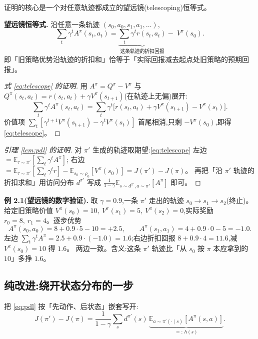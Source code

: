 \documentclass[11pt]{article}
\newcommand{\E}{\mathbb{E}}
\newcommand{\Ap}{A^{\pi}}
\newcommand{\Vp}{V^{\pi}}
\newcommand{\Qp}{Q^{\pi}}
\newcommand{\dpip}{d^{\pi'}}
\theoremstyle{plain}
\theoremstyle{definition}
\theoremstyle{remark}
\begin{document}
证明的核心是一个对任意轨迹都成立的望远镜(telescoping)恒等式。

\begin{keybox}
\textbf{望远镜恒等式.} 沿任意一条轨迹 $(s_0,a_0,s_1,a_1,\dots)$,
\begin{equation}\label{eq:telescope}
\sum_t \gamma^t \Ap(s_t,a_t)=\underbrace{\sum_t\gamma^t r(s_t,a_t)}_{\text{这条轨迹的折扣回报}}-\;\Vp(s_0).
\end{equation}
即「旧策略优势沿轨迹的折扣和」恰等于「实际回报减去起点处旧策略的预期回报」。
\end{keybox}

\begin{proof}[式 \eqref{eq:telescope} 的证明]
用 $\Ap=\Qp-\Vp$ 与 $\Qp(s_t,a_t)=r(s_t,a_t)+\gamma\Vp(s_{t+1})$(在轨迹上无偏)展开:
\[
\sum_t\gamma^t\Ap(s_t,a_t)=\sum_t\gamma^t\big[r(s_t,a_t)+\gamma\Vp(s_{t+1})-\Vp(s_t)\big].
\]
价值项 $\sum_t[\gamma^{t+1}\Vp(s_{t+1})-\gamma^t\Vp(s_t)]$ 首尾相消,只剩 $-\Vp(s_0)$,即得 \eqref{eq:telescope}。
\end{proof}

\begin{proof}[引理 \ref{lem:pdl} 的证明]
对 $\pi'$ 生成的轨迹取期望:\eqref{eq:telescope} 左边 $=\E_{\tau\sim\pi'}[\sum_t\gamma^t\Ap]$;
右边 $=\E_{\tau\sim\pi'}[\sum_t\gamma^t r]-\E_{s_0\sim\rho_0}[\Vp(s_0)]=J(\pi')-J(\pi)$。
再把「沿 $\pi'$ 轨迹的折扣求和」用访问分布 $\dpip$ 写成 $\frac{1}{1-\gamma}\E_{s\sim\dpip,a\sim\pi'}[\Ap]$ 即可。
\end{proof}

\begin{exbox}
\textbf{例 2.1(望远镜的数字验证).} 取 $\gamma=0.9$,一条 $\pi'$ 走出的轨迹 $s_0\to s_1\to s_2$(终止)。
给定旧策略价值 $\Vp(s_0)=10,\ \Vp(s_1)=5,\ \Vp(s_2)=0$,实际奖励 $r_0=8,\ r_1=4$。逐步优势
\[
\Ap(s_0,a_0)=8+0.9\cdot5-10=+2.5,\qquad \Ap(s_1,a_1)=4+0.9\cdot0-5=-1.0.
\]
左边 $\sum_t\gamma^t\Ap=2.5+0.9\cdot(-1.0)=1.6$;右边折扣回报 $8+0.9\cdot4=11.6$,减 $\Vp(s_0)=10$ 得 $1.6$。
两边一致。含义:这条 $\pi'$ 轨迹比「从 $s_0$ 按 $\pi$ 本应拿到的 $10$」多挣 $1.6$。
\end{exbox}

\subsection{纯改进:绕开状态分布的一步}

把 \eqref{eq:pdl} 按「先动作、后状态」嵌套写开:
\begin{equation}\label{eq:pdl-nest}
J(\pi')-J(\pi)=\frac{1}{1-\gamma}\sum_s \dpip(s)\,\underbrace{\E_{a\sim\pi'(\cdot\mid s)}[\Ap(s,a)]}_{=:\,h(s)}.
\end{equation}
\end{document}
